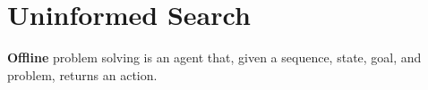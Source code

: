 
\section{Uninformed Search}

\begin{definition}
	\textbf{Offline} problem solving is an agent that, given a sequence, state, goal, and problem, returns an action.
\end{definition}
